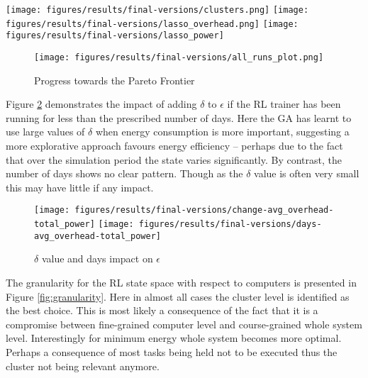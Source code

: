 \documentclass[10pt, conference, compsocconf]{IEEEtran}
\begin{document}
\begin{figure*}[!b]
\texttt{[image: figures/results/final-versions/clusters.png]}%
\hfil
%
\texttt{[image: figures/results/final-versions/lasso\_overhead.png]}%
\hfil
%
\texttt{[image: figures/results/final-versions/lasso\_power]}%
\caption{Objective clustering}
\label{fig:clustering}	
\end{figure*}

\begin{figure}[H]
  \texttt{[image: figures/results/final-versions/all\_runs\_plot.png]}
  \label{fig:pareto}
  \caption{Progress towards the Pareto Frontier}
\end{figure}
Figure \ref{fig:changes} demonstrates the impact of adding $\delta$ to $\epsilon$ if the RL trainer has been running for less than the prescribed number of days. Here the GA has learnt to use large values of $\delta$ when energy consumption is more important, suggesting a more explorative approach favours energy efficiency -- perhaps due to the fact that over the simulation period the state varies significantly. By contrast, the number of days shows no clear pattern. Though as the $\delta$ value is often very small this may have little if any impact.
\begin{figure}[H]
%
 \texttt{[image: figures/results/final-versions/change-avg\_overhead-total\_power]}%
\hfil%
%
\texttt{[image: figures/results/final-versions/days-avg\_overhead-total\_power]}%
%
\caption{$\delta$ value and days impact on $\epsilon$}
\label{fig:changes}
\end{figure}
The granularity for the RL state space with respect to computers is presented in Figure \ref{fig:granularity}. Here in almost all cases the cluster level is identified as the best choice. This is most likely a consequence of the fact that it is a compromise between fine-grained computer level and course-grained whole system level. Interestingly for minimum energy whole system becomes more optimal. {\color{green} Perhaps a consequence of most tasks being held not to be executed thus the cluster not being relevant anymore.}
\end{document}
